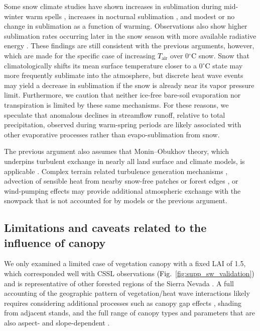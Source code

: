 \documentclass[draft]{agujournal2019}
\newcommand{\fig}[2]{\textcolor{black}{(Fig.~\ref{#1}{#2})}}   %
\newcommand{\tair}{\textcolor{black}{$T_{\mathrm{air}}$}\xspace}
\newcommand{\degrc}{\textcolor{black}{$^\circ$C}\xspace}
\begin{document}
Some snow climate studies have shown increases in sublimation during mid-winter warm spells \cite{Scaff2024-ob}, increases in nocturnal sublimation \cite{Rudisill2026-de}, and modest or no change \cite{Sexstone2018-rc} in sublimation as a function of warming. 
Observations also show higher sublimation rates occurring later in the snow season with more available radiative energy \cite{Schwat2025-ur}.
These findings are still consistent with the previous arguments, however, which are made for the specific case of increasing \tair over 0\degrc snow.
Snow that climatologically shifts its mean surface temperature closer to a 0\degrc state may more frequently sublimate into the atmosphere, but discrete heat wave events may yield a decrease in sublimation if the snow is already near its vapor pressure limit.
Furthermore, we caution that neither ice-free bare-soil evaporation nor transpiration is limited by these same mechanisms.
For these reasons, we speculate that anomalous declines in streamflow runoff, relative to total precipitation, observed during warm-spring periods are likely associated with other evaporative processes rather than evapo-sublimation from snow. 

The previous argument also assumes that Monin--Obukhov theory, which underpins turbulent exchange in nearly all land surface and climate models, is applicable \cite{Foken2006-bg}.
Complex terrain related turbulence generation mechanisms \cite{Schwat2025-ur}, advection of sensible heat from nearby snow-free patches or forest edges \cite{Harder2017-zo}, or wind-pumping \cite{Bartlett2011-ds} effects may provide additional atmospheric exchange with the snowpack that is not accounted for by models or the previous argument.



\subsection{Limitations and caveats related to the influence of canopy} 
We only examined a limited case of vegetation canopy with a fixed LAI of 1.5, which corresponded well with CSSL observations \fig{fig:supp_sw_validation}{} and is representative of other forested regions of the Sierra Nevada \cite{VanGunst2012, Krogh2020-dh}.
A full accounting of the geographic pattern of vegetation/heat wave interactions likely requires considering additional processes such as canopy gap effects \cite{Lawler2011-bs}, shading from adjacent stands, and the full range of canopy types and parameters that are also aspect- and slope-dependent \cite{Broxton2015-wh}.
\end{document}
